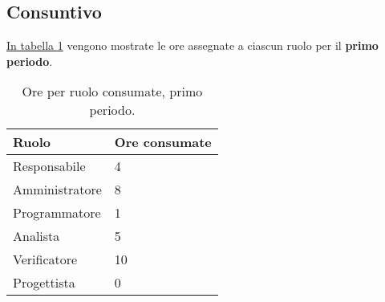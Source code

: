 \subsection{Consuntivo}

\label{sec:Consuntivo_PrimoPeriodo}

\hyperref[tab:consuntivo_primo_periodo]{In tabella \ref{tab:consuntivo_primo_periodo}} vengono mostrate le ore assegnate a ciascun ruolo per il \textbf{primo periodo}.
\begin{table}[!h]
    \centering
    \begin{tabular}{| l | l |}
    \hline
        \textbf{Ruolo} & 
        \textbf{Ore consumate}\\
    \hline
        Responsabile & 4\\
    \hline
        Amministratore & 8\\
    \hline
        Programmatore & 1\\
    \hline
        Analista & 5\\
    \hline
        Verificatore & 10\\
    \hline
        Progettista & 0\\
    \hline
    \end{tabular}
    \caption{Ore per ruolo consumate, primo periodo.}
    \label{tab:consuntivo_primo_periodo} 
\end{table}
